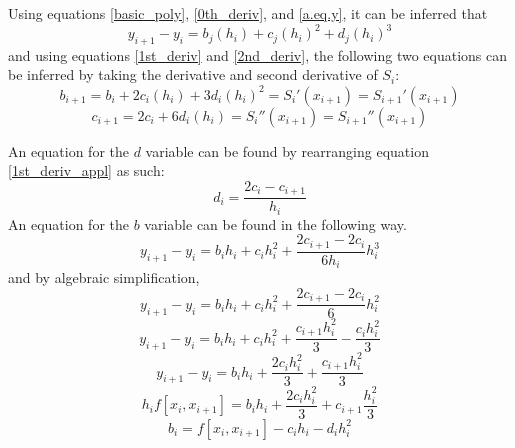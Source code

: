 \documentclass[12pt, letterpaper]{article} %
\begin{document}
Using equations \ref{basic_poly}, \ref{0th_deriv}, and \ref{a.eq.y}, it can be inferred that
\begin{equation}
y_{i + 1} - y_i =  b_j(h_i) + c_j(h_i)^2 + d_j(h_i)^3
\label{d_1st}
\end{equation}
and using equations \ref{1st_deriv} and \ref{2nd_deriv}, the following two equations can be inferred by taking the derivative and second derivative of \(S_i\):
\begin{equation}
b_{i + 1} = b_i + 2c_i(h_i) + 3d_i(h_i)^2 = S_i'(x_{i + 1}) = S_{i + 1}'(x_{i + 1})
\label{1st_deriv_appl}
\end{equation}
\begin{equation}
c_{i + 1} = 2c_i + 6d_i(h_i) = S_i''(x_{i + 1}) = S_{i + 1}''(x_{i + 1})
\label{2nd_deriv_appl}
\end{equation}

An equation for the $d$ variable can be found by rearranging equation \ref{1st_deriv_appl} as such:
\begin{equation}
d_i = \dfrac{2c_i - c_{i + 1}}{h_i}
\label{d_2nd}
\end{equation}
An equation for the $b$ variable can be found in the following way.
\begin{equation}
y_{i + 1} - y_i = b_ih_i + c_ih_i^2 + \dfrac{2c_{i + 1} - 2c_i}{6h_i}h_i^3
\label{b_1st}
\end{equation}
and by algebraic simplification,
\begin{equation}
y_{i + 1} - y_i = b_ih_i + c_ih_i^2 + \dfrac{2c_{i + 1} - 2c_i}{6}h_i^2
\label{b_2nd}
\end{equation}
\begin{equation}
y_{i + 1} - y_i = b_ih_i + c_ih_i^2 + \dfrac{c_{i + 1}h_i^2}{3} - \dfrac{c_ih_i^2}{3}
\label{b_3rd}
\end{equation}
\begin{equation}
y_{i + 1} - y_i = b_ih_i + \dfrac{2c_ih_i^2}{3} + \dfrac{c_{i + 1}h_i^2}{3}
\label{b_4th}
\end{equation}
\begin{equation}
h_if[x_i,x_{i+1}] = b_ih_i + \dfrac{2c_ih_i^2}{3} + c_{i+1}\dfrac{h_i^2}{3}
\label{b_5th}
\end{equation}
\begin{equation}
b_i = f[x_i,x_{i+1}] - c_ih_i - d_ih_i^2
\label{b_6th}
\end{equation}
\end{document}
